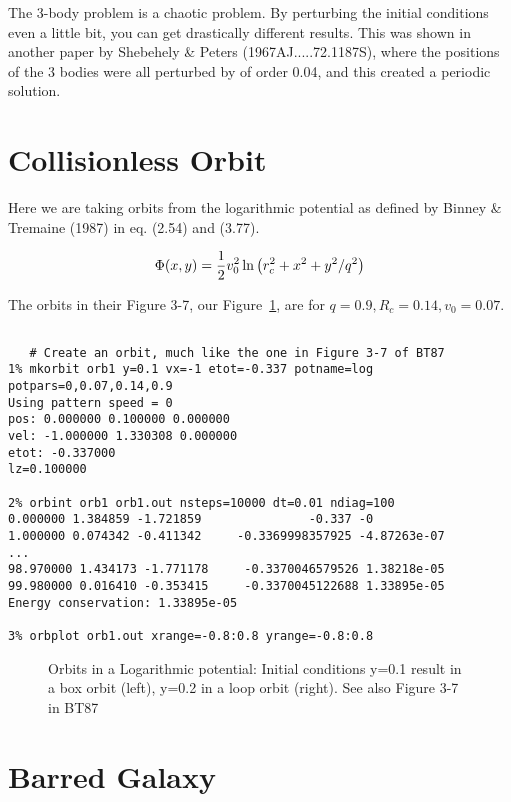 The 3-body problem is a chaotic problem. By perturbing the initial conditions
even a little bit, you can get drastically different results. This was shown
in another paper by Shebehely \& Peters (1967AJ.....72.1187S), where the
positions of the 3 bodies were all perturbed by of order 0.04, and this 
created a periodic solution.


\section{Collisionless Orbit}

Here we are taking orbits from the logarithmic potential as defined
by Binney \& Tremaine (1987) in eq. (2.54) and (3.77).

$$
   \Phi(x,y) = {1\over 2} v_0^2
                    \ln{ \left( r_c^2 + x^2  + y^2/q^2 \right) }
$$

The orbits in their Figure 3-7, our Figure~\ref{f:log}, are for
$q=0.9, R_c=0.14, v_0=0.07$.

\footnotesize\begin{verbatim}

   # Create an orbit, much like the one in Figure 3-7 of BT87
1% mkorbit orb1 y=0.1 vx=-1 etot=-0.337 potname=log potpars=0,0.07,0.14,0.9
Using pattern speed = 0
pos: 0.000000 0.100000 0.000000
vel: -1.000000 1.330308 0.000000
etot: -0.337000
lz=0.100000

2% orbint orb1 orb1.out nsteps=10000 dt=0.01 ndiag=100
0.000000 1.384859 -1.721859               -0.337 -0
1.000000 0.074342 -0.411342     -0.3369998357925 -4.87263e-07
...
98.970000 1.434173 -1.771178     -0.3370046579526 1.38218e-05
99.980000 0.016410 -0.353415     -0.3370045122688 1.33895e-05
Energy conservation: 1.33895e-05

3% orbplot orb1.out xrange=-0.8:0.8 yrange=-0.8:0.8

\end{verbatim}\normalsize

\begin{figure}[t]
\caption[Orbits in a Logarithmic potential]
{Orbits in a Logarithmic potential:
Initial conditions y=0.1 result in a box orbit (left), 
y=0.2 in a loop orbit (right). See also Figure 3-7 in BT87}
\label{f:log}
\end{figure}

\section{Barred Galaxy}

